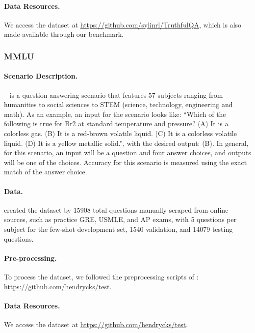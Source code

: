 \paragraph{Data Resources.}
We access the dataset at \url{https://github.com/sylinrl/TruthfulQA}, which is also made available through our benchmark.

\subsubsection{MMLU}

\paragraph{Scenario Description.}
\mmlu~\citep{hendrycks2021measuring} is a question answering scenario that features 57 subjects ranging from humanities to social sciences to STEM (science, technology, engineering and math).
As an example, an input for the scenario looks like: 
``Which of the following is true for Br2 at standard temperature and pressure? (A) It is a colorless gas. (B) It is a red-brown volatile liquid. (C) It is a colorless volatile liquid. (D) It is a yellow metallic solid.'', with the desired output: (B).
In general, for this scenario, an input will be a question and four answer choices, and outputs will be one of the choices.
Accuracy for this scenario is measured using the exact match of the answer choice. 

\paragraph{Data.}
\citet{hendrycks2021measuring} created the dataset by 15908 total questions manually scraped from online sources, such as practice GRE, USMLE, and AP exams, with 5 questions per subject for the few-shot development set, 1540 validation, and 14079 testing questions.

\paragraph{Pre-processing.}
To process the dataset, we followed the preprocessing scripts of \citet{hendrycks2021measuring}: \url{https://github.com/hendrycks/test}.

\paragraph{Data Resources.}
We access the dataset at \url{https://github.com/hendrycks/test}.


